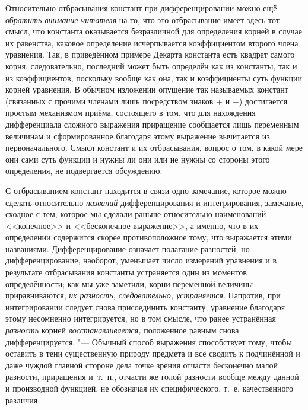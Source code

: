 Относительно отбрасывания констант при дифференцировании можно ещё
{\em обратить внимание читателя} на то, что это отбрасывание имеет здесь тот
смысл, что константа оказывается безразличной для определения корней в случае
их равенства, каковое определение исчерпывается коэффициентом второго члена
уравнения. Так, в приведённом примере Декарта константа есть квадрат самого
корня, следовательно, последний может быть определён как из константы, так и из
коэффициентов, поскольку вообще как она, так и коэффициенты суть функции корней
уравнения. В обычном изложении опущение так называемых констант (связанных с
прочими членами лишь посредством знаков $+$ и $-$) достигается простым
механизмом приёма, состоящего в том, что для нахождения дифференциала сложного
выражения приращение сообщается лишь переменным величинам и сформированное
благодаря этому выражение вычитается из первоначального. Смысл констант и их
отбрасывания, вопрос о том, в какой мере они сами суть функции и нужны ли они
или не нужны со стороны этого определения, не подвергается обсуждению.

С отбрасыванием констант находится в связи одно замечание, которое можно
сделать относительно {\em названий} дифференцирования и интегрирования,
замечание, сходное с тем, которое мы сделали раньше относительно наименований
<<конечное>> и <<бесконечное выражение>>, а именно, что в их
определении содержится скорее противоположное тому, что выражается этими
названиями. Дифференцирование означает полагание разностей; но
дифференцирование, наоборот, уменьшает число измерений уравнения и в результате
отбрасывания константы устраняется один из моментов определённости; как мы уже
заметили, корни переменной величины приравниваются,
{\em их разность, следовательно, устраняется}. Напротив, при интегрировании
следует снова присоединить константу; уравнение благодаря этому несомненно
интегрируется, но в том смысле, что ранее устранённая {\em разность} корней
{\em восстанавливается,} положенное равным снова дифференцируется. "--- Обычный
способ выражения способствует тому, чтобы оставить в тени существенную природу
предмета и всё сводить к подчинённой и даже чуждой главной стороне дела точке
зрения отчасти бесконечно малой разности, приращения и~т.~п., отчасти же голой
разности вообще между данной и производной функцией, не обозначая их
специфического, т.~е. качественного различия.

